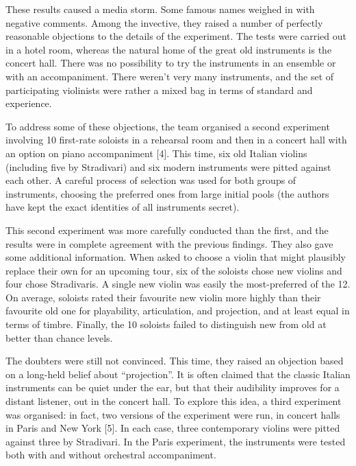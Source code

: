   These results caused a media storm. Some famous names weighed in with 
  negative comments. Among the invective, they raised a number of perfectly 
  reasonable objections to the details of the experiment. The tests were 
  carried out in a hotel room, whereas the natural home of the great old 
  instruments is the concert hall. There was no possibility to try the 
  instruments in an ensemble or with an accompaniment. There weren’t very many 
  instruments, and the set of participating violinists were rather a mixed bag 
  in terms of standard and experience. 

  To address some of these objections, the team organised a second experiment 
  involving 10 first-rate soloists in a rehearsal room and then in a concert 
  hall with an option on piano accompaniment [4]. This time, six old Italian 
  violins (including five by Stradivari) and six modern instruments were pitted 
  against each other. A careful process of selection was used for both groups 
  of instruments, choosing the preferred ones from large initial pools (the 
  authors have kept the exact identities of all instruments secret). 

  This second experiment was more carefully conducted than the first, and the 
  results were in complete agreement with the previous findings. They also gave 
  some additional information. When asked to choose a violin that might 
  plausibly replace their own for an upcoming tour, six of the soloists chose 
  new violins and four chose Stradivaris. A single new violin was easily the 
  most-preferred of the 12. On average, soloists rated their favourite new 
  violin more highly than their favourite old one for playability, 
  articulation, and projection, and at least equal in terms of timbre. Finally, 
  the 10 soloists failed to distinguish new from old at better than chance 
  levels. 

  The doubters were still not convinced. This time, they raised an objection 
  based on a long-held belief about “projection”. It is often claimed that the 
  classic Italian instruments can be quiet under the ear, but that their 
  audibility improves for a distant listener, out in the concert hall. To 
  explore this idea, a third experiment was organised: in fact, two versions of 
  the experiment were run, in concert halls in Paris and New York [5]. In each 
  case, three contemporary violins were pitted against three by Stradivari. In 
  the Paris experiment, the instruments were tested both with and without 
  orchestral accompaniment. 

